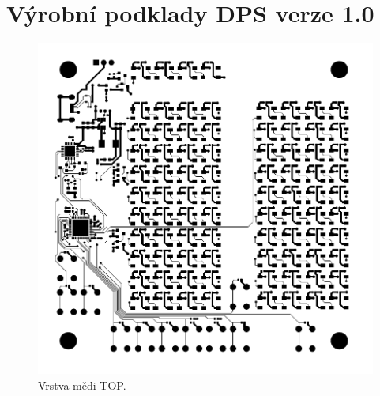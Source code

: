 



\chapter{Výrobní podklady DPS verze 1.0}

  \begin{figure}[!h]
    \begin{center}
      \includegraphics[scale=0.9]{prilohy/Verze1_vrstva_Cu_TOP.png}
    \end{center}
    \caption[Vrstva mědi TOP]{Vrstva mědi TOP.}
  \end{figure}

